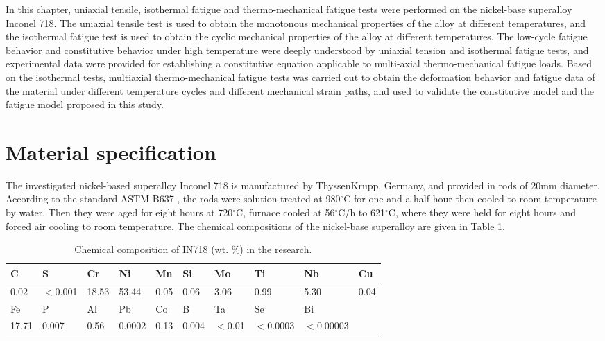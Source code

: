 In this chapter, uniaxial tensile, isothermal fatigue and thermo-mechanical fatigue tests were performed on the nickel-base superalloy Inconel 718. The uniaxial tensile test is used to obtain the monotonous mechanical properties of the alloy at different temperatures, and the isothermal fatigue test is used to obtain the cyclic mechanical properties of the alloy at different temperatures. The low-cycle fatigue behavior and constitutive behavior under high temperature were deeply understood by uniaxial tension and isothermal fatigue tests, and experimental data were provided for establishing a constitutive equation applicable to multi-axial thermo-mechanical fatigue loads. Based on the isothermal tests, multiaxial thermo-mechanical fatigue tests was carried out to obtain the deformation behavior and fatigue data of the material under different temperature cycles and different mechanical strain paths, and used to validate the constitutive model and the fatigue model proposed in this study.




\section{Material specification}
The investigated nickel-based superalloy Inconel 718 is manufactured by ThyssenKrupp, Germany, and provided in rods of 20mm diameter. According to the standard ASTM B637 \cite{ASTMB63716}, the rods were solution-treated at 980$^{\circ}$C for one and a half hour then cooled to room temperature by water. Then they were aged for eight hours at 720$^{\circ}$C, furnace cooled at 56$^{\circ}$C/h to 621$^{\circ}$C, where they were held for eight hours and forced air cooling to room temperature.
The chemical compositions of the nickel-base superalloy are given in Table \ref{Tab:ChemicalCompositionofIN718}.

\begin{table}[htbp]
  \centering
  \caption{Chemical composition of IN718 (wt. \%) in the research.}
    \begin{tabular}{llllllllll}
    \toprule
    C     & S     & Cr    & Ni    & Mn    & Si    & Mo    & Ti    & Nb    & Cu \\
    \midrule
    0.02  & $<$0.001 & 18.53 & 53.44 & 0.05  & 0.06  & 3.06  & 0.99  & 5.30  & 0.04 \\
    \midrule
    Fe    & P     & Al    & Pb    & Co    & B     & Ta    & Se    & Bi    &  \\
    \midrule
    17.71 & 0.007 & 0.56  & 0.0002 & 0.13  & 0.004 & $<$0.01 & $<$0.0003 & $<$0.00003 &  \\
    \bottomrule
    \end{tabular}%
  \label{Tab:ChemicalCompositionofIN718}%
\end{table}%

